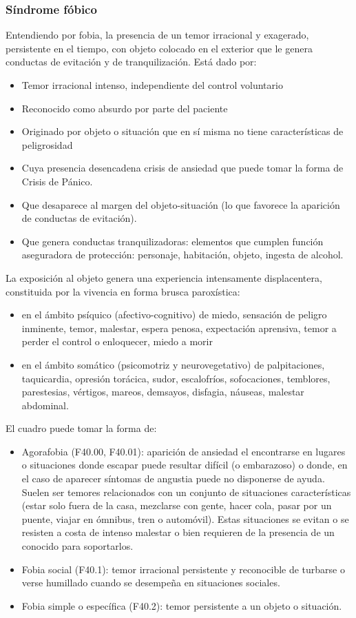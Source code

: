 \documentclass{scrbook}
\begin{document}
\subsubsection*{Síndrome fóbico}
Entendiendo por fobia, la presencia de un temor irracional y exagerado, persistente en el tiempo, con objeto colocado en el exterior que le genera conductas de evitación y de tranquilización. Está dado por:
\begin{itemize}
	\item Temor irracional intenso, independiente del control voluntario
	\item Reconocido como absurdo por parte del paciente
	\item Originado por objeto o situación que en sí misma no tiene características de peligrosidad
	\item Cuya presencia desencadena crisis de ansiedad que puede tomar la forma de Crisis de Pánico.
	\item Que desaparece al margen del objeto-situación (lo que favorece la aparición de conductas de evitación).
	\item Que genera conductas tranquilizadoras: elementos que cumplen función aseguradora de protección: personaje, habitación, objeto, ingesta de alcohol.
\end{itemize}
La exposición al objeto genera una experiencia intensamente displacentera, constituida por la vivencia en forma brusca paroxística:
\begin{itemize}
	\item en el ámbito psíquico (afectivo-cognitivo) de miedo, sensación de peligro inminente, temor, malestar, espera penosa, expectación aprensiva, temor a perder el control o enloquecer, miedo a morir
	\item en el ámbito somático (psicomotriz y neurovegetativo) de palpitaciones, taquicardia, opresión torácica, sudor, escalofríos, sofocaciones, temblores, parestesias, vértigos, mareos, demsayos, disfagia, náuseas, malestar abdominal.
\end{itemize}
El cuadro puede tomar la forma de:
\begin{itemize}
	\item Agorafobia (F40.00, F40.01): aparición de ansiedad el encontrarse en lugares o situaciones donde escapar puede resultar difícil (o embarazoso) o donde, en el caso de aparecer síntomas de angustia puede no disponerse de ayuda. Suelen ser temores relacionados con un conjunto de situaciones características (estar solo fuera de la casa, mezclarse con gente, hacer cola, pasar por un puente, viajar en ómnibus, tren o automóvil). Estas situaciones se evitan o se resisten a costa de intenso malestar o bien requieren de la presencia de un conocido para soportarlos.
	\item Fobia social (F40.1): temor irracional persistente y reconocible de turbarse o verse humillado cuando se desempeña en situaciones sociales.
	\item Fobia simple o específica (F40.2): temor persistente a un objeto o situación.
\end{itemize}
\end{document}
